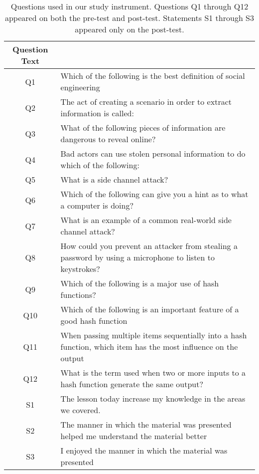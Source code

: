 \begin{table}[h]
  \scriptsize
  \begin{tabular}{c | p{6cm}}
Question Text  &     \\
\hline
Q1 & Which of the following is the best definition of social engineering \\
Q2  & The act of creating a scenario in order to extract information is called:   \\
Q3 & What of the following pieces of information are dangerous to reveal online?  \\
Q4  & Bad actors can use stolen personal information to do which of the following: \\
Q5 & What is a side channel attack?  \\
Q6  & Which of the following can give you a hint as to what a computer is doing?   \\
Q7 & What is an example of a common real-world side channel attack? \\
Q8  & How could you prevent an attacker from stealing a password by using a microphone to listen to keystrokes?\\
Q9 & Which of the following is a major use of hash functions? \\
Q10 & Which of the following is an important feature of a good hash function  \\
Q11 & When passing multiple items sequentially into a hash function, which item has the most influence on the output \\
Q12 & What is the term used when two or more inputs to a hash function generate the same output? \\
\hline
S1 & The lesson today increase my knowledge in the areas we covered. \\
S2  & The manner in which the material was presented helped me understand the material better\\
S3 & I enjoyed the manner in which the material was presented  \\
\end{tabular}
\caption{Questions used in our study instrument.  Questions Q1 through Q12
    appeared on both the pre-test and post-test.  Statements S1 through S3
    appeared only on the post-test.}
\label{fig:assessment}
\end{table}



